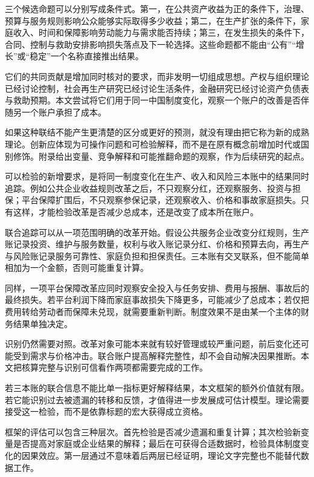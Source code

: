 \documentclass[UTF8,fontset=fandol,zihao=-4,oneside,openany]{ctexbook}
\begin{document}
\label{arg:P244}
三个候选命题可以分别写成条件式。第一，在公共资产收益为正的条件下，治理、预算与服务规则影响公众能够实际取得多少收益；第二，在生产扩张的条件下，家庭收入、时间和保障影响劳动能力与需求能否持续；第三，在发生损失的条件下，合同、控制与救助安排影响损失落点及下一轮选择。这些命题都不能由“公有”“增长”或“稳定”一个名称直接推出结果。

它们的共同贡献是增加同时核对的要求，而非发明一切组成思想。产权与组织理论已经讨论控制，社会再生产研究已经讨论生活条件，金融研究已经讨论资产负债表与救助预期。本文尝试将它们用于同一中国制度变化，观察一个账户的改善是否伴随另一个账户承担了成本。

如果这种联结不能产生更清楚的区分或更好的预测，就没有理由把它称为新的成熟理论。创新应体现为可操作问题和可检验解释，而不是在原有概念前增加时代或国别修饰。附录给出变量、竞争解释和可能推翻命题的观察，作为后续研究的起点。

可以检验的新增要求，是将同一制度变化在生产、收入和风险三本账中的结果同时追踪。例如公共企业收益规则改革之后，不只观察分红，还观察服务、投资与担保；平台保障扩围后，不只观察参保记录，还观察收入、价格和事故家庭损失。只有这样，才能检验改革是否减少总成本，还是改变了成本所在账户。

\label{arg:P245}
联合追踪可以从一项范围明确的改革开始。假设公共服务企业改变分红规则，生产账记录投资、维护与服务数量，权利与收入账记录分红、价格和预算去向，再生产与风险账记录服务可靠性、家庭负担和担保责任。三本账有交叉联系，但不能简单相加为一个金额，否则可能重复计算。

同样，一项平台保障改革应同时观察安全投入与任务安排、费用与报酬、事故后的最终损失。若平台利润下降而家庭事故损失下降更多，可能减少了总成本；若仅把费用转给劳动者而保障未兑现，就需要重新判断。制度效果不是由某一个主体的财务结果单独决定。

识别仍然需要对照。改革对象可能本来就有较好管理或较严重问题，前后变化还可能受到需求与价格冲击。联合账户提高解释完整性，却不会自动解决因果推断。本文把核算完整与识别可信看作两项都需要完成的工作。

若三本账的联合信息不能比单一指标更好解释结果，本文框架的额外价值就有限。若它能识别过去被遗漏的转移和反馈，才值得进一步发展成可估计模型。理论需要接受这一检验，而不是依靠标题的宏大获得成立资格。

\label{arg:P246}
框架的评估可以包含三种层次。首先检验是否减少遗漏和重复计算；其次检验新变量是否提高对家庭或企业结果的解释；最后在可获得合适数据时，检验具体制度变化的因果效应。第一层通过不意味着后两层已经证明，理论文字完整也不能替代数据工作。
\end{document}
